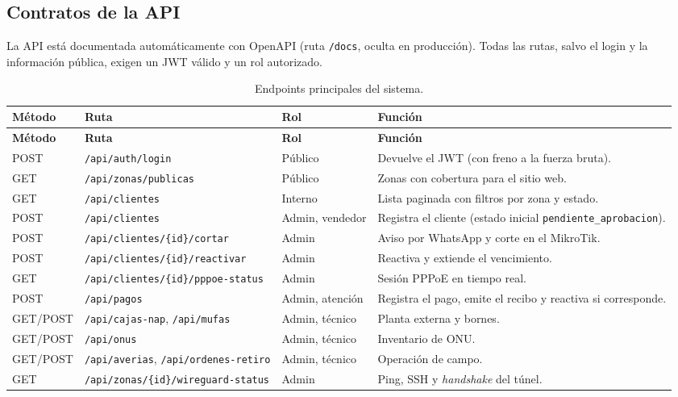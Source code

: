 \subsection{Contratos de la API}
\label{sec:ce02-api}

La API está documentada automáticamente con OpenAPI (ruta \texttt{/docs}, oculta en
producción). Todas las rutas, salvo el login y la información pública, exigen un JWT
válido y un rol autorizado.

{\small
\begin{longtable}{L{1.2cm}L{5.2cm}L{2.4cm}L{5.0cm}}
\caption{Endpoints principales del sistema.}\label{tab:ce02-endpoints}\\
\toprule
\textbf{Método} & \textbf{Ruta} & \textbf{Rol} & \textbf{Función} \\
\midrule
\endfirsthead
\toprule
\textbf{Método} & \textbf{Ruta} & \textbf{Rol} & \textbf{Función} \\
\midrule
\endhead
\bottomrule
\endlastfoot
POST & \texttt{/api/auth/login} & Público & Devuelve el JWT (con freno a la fuerza bruta). \\
GET & \texttt{/api/zonas/publicas} & Público & Zonas con cobertura para el sitio web. \\
GET & \texttt{/api/clientes} & Interno & Lista paginada con filtros por zona y estado. \\
POST & \texttt{/api/clientes} & Admin, vendedor & Registra el cliente (estado inicial \texttt{pendiente\_aprobacion}). \\
POST & \texttt{/api/clientes/\{id\}/cortar} & Admin & Aviso por WhatsApp y corte en el MikroTik. \\
POST & \texttt{/api/clientes/\{id\}/reactivar} & Admin & Reactiva y extiende el vencimiento. \\
GET & \texttt{/api/clientes/\{id\}/pppoe-status} & Admin & Sesión PPPoE en tiempo real. \\
POST & \texttt{/api/pagos} & Admin, atención & Registra el pago, emite el recibo y reactiva si corresponde. \\
GET/POST & \texttt{/api/cajas-nap}, \texttt{/api/mufas} & Admin, técnico & Planta externa y bornes. \\
GET/POST & \texttt{/api/onus} & Admin, técnico & Inventario de ONU. \\
GET/POST & \texttt{/api/averias}, \texttt{/api/ordenes-retiro} & Admin, técnico & Operación de campo. \\
GET & \texttt{/api/zonas/\{id\}/wireguard-status} & Admin & Ping, SSH y \emph{handshake} del túnel. \\

\end{longtable}}
